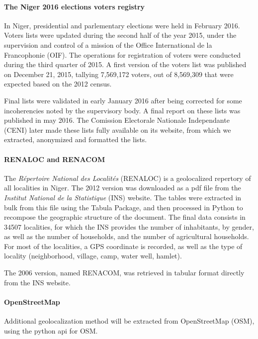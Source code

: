 \documentclass[12pt]{article}\usepackage[]{graphicx}\usepackage[]{color}
\begin{document}
\paragraph{The Niger 2016 elections voters registry} In Niger, presidential and parlementary elections were held in February 2016. Voters lists were updated during the second half of the year 2015, under the supervision and control of a mission of the Office International de la Francophonie (OIF). The operations for registration of voters were conducted during the third quarter of 2015. A first version of the voters list was published on December 21, 2015, tallying 7,569,172 voters, out of 8,569,309 that were expected based on the 2012 census.

Final lists were validated in early January 2016 after being corrected for some incoherencies noted by the supervisory body. A final report on these lists was published in may 2016. The Comission Electorale Nationale Independante (CENI) later made these lists fully available on its website, from which we extracted, anonymized and formatted the lists.

\paragraph{RENALOC and RENACOM} The \textit{Répertoire National des Localités} (RENALOC) is a geolocalized repertory of all localities in Niger.  The 2012 version was downloaded as a pdf file from the \textit{Institut National de la Statistique} (INS) website. The tables were extracted in bulk from this file using the Tabula Package, and then processed in Python to recompose the geographic structure of the document. The final data consists in 34507 localities, for which the INS provides the number of inhabitants, by gender, as well as the number of households, and the number of agricultural households. For most of the localities, a GPS coordinate is recorded, as well as the type of locality (neighborhood, village, camp, water well, hamlet).

The 2006 version, named RENACOM, was retrieved in tabular format directly from the INS website.

\paragraph{OpenStreetMap} Additional geolocalization method will be extracted from OpenStreetMap (OSM), using the python api for OSM.
\end{document}

